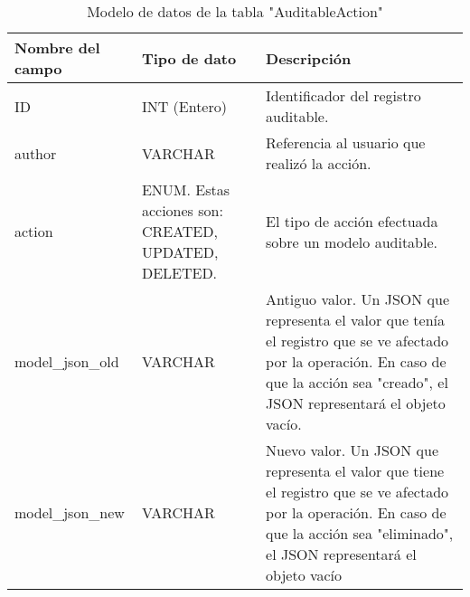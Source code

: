 \begin{table}[h]
\centering
\begin{tabular}{| p{} | p{} | p{} |}
\hline
\textbf{Nombre del campo} & \textbf{Tipo de dato}                               & \textbf{Descripción}                                                                                                                                                                   \\ \hline
ID                        & INT (Entero)                                        & Identificador del registro auditable.                                                                                                                                                  \\ \hline
author                    & VARCHAR                                             & Referencia al usuario que realizó la acción.                                                                                                                                           \\ \hline
action                    & ENUM. Estas acciones son: CREATED, UPDATED, DELETED. & El tipo de acción efectuada sobre un modelo auditable.                                                                                                                                 \\ \hline
model\_json\_old          & VARCHAR                                             & Antiguo valor. Un JSON que representa el valor que tenía el registro que se ve afectado por la operación. En caso de que la acción sea "creado", el JSON representará el objeto vacío. \\ \hline
model\_json\_new          & VARCHAR                                             & Nuevo valor. Un JSON que representa el valor que tiene el registro que se ve afectado por la operación. En caso de que la acción sea "eliminado", el JSON representará el objeto vacío \\ \hline
\end{tabular}

\caption{Modelo de datos de la tabla "AuditableAction"}
\label{tabla:1.3}
\end{table}
